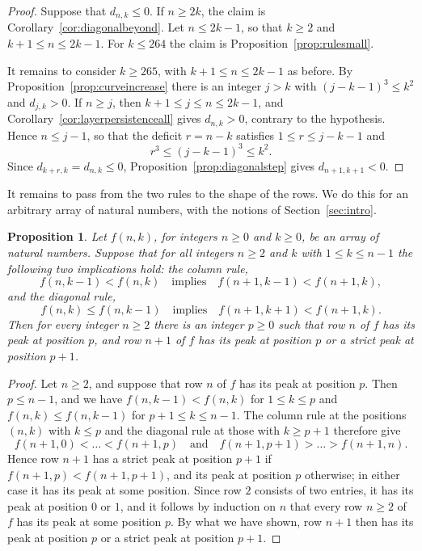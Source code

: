 \documentclass{amsart}
\makeatletter
\newtheorem{proposition}[theorem]{Proposition}
\theoremstyle{definition}
\theoremstyle{remark}
\numberwithin{equation}{section}
\def\subsection{\@startsection{subsection}{2}\z@{.5\linespacing\@plus.7\linespacing}{-.5em}{\normalfont\bfseries\boldmath}}
\makeatother
\begin{document}
\begin{proof}
Suppose that $d_{n,k}\le0$. If $n\ge2k$, the claim is
Corollary~\ref{cor:diagonalbeyond}. Let $n\le2k-1$, so that $k\ge2$ and
$k+1\le n\le2k-1$. For $k\le264$ the claim is
Proposition~\ref{prop:rulesmall}.

It remains to consider $k\ge265$, with $k+1\le n\le2k-1$ as before. By
Proposition~\ref{prop:curveincrease} there is an integer $j>k$ with
$(j-k-1)^3\le k^2$ and $d_{j,k}>0$. If $n\ge j$, then
$k+1\le j\le n\le2k-1$, and Corollary~\ref{cor:layerpersistenceall} gives
$d_{n,k}>0$, contrary to the hypothesis. Hence $n\le j-1$, so that the
deficit $r=n-k$ satisfies $1\le r\le j-k-1$ and
\[
r^3\le(j-k-1)^3\le k^2 .
\]
Since
$d_{k+r,k}=d_{n,k}\le0$, Proposition~\ref{prop:diagonalstep} gives
$d_{n+1,k+1}<0$.
\end{proof}

\subsection{The induction on the row}\label{subsec:staircase-induction}

It remains to pass from the two rules to the shape of the rows. We do this
for an arbitrary array of
natural numbers, with the notions of Section~\ref{sec:intro}.

\begin{proposition}\label{prop:rowinduction}
Let $f(n,k)$, for integers $n\ge0$ and $k\ge0$, be an array of natural
numbers. Suppose that for all integers $n\ge2$ and $k$ with $1\le k\le n-1$
the following two implications hold: the column rule,
\[
f(n,k-1)<f(n,k)\quad\text{implies}\quad f(n+1,k-1)<f(n+1,k),
\]
and the diagonal rule,
\[
f(n,k)\le f(n,k-1)\quad\text{implies}\quad f(n+1,k+1)<f(n+1,k).
\]
Then for every integer $n\ge2$ there is an integer $p\ge0$ such that row
$n$ of $f$ has its peak at position $p$, and row $n+1$ of $f$ has
its peak at position $p$ or a strict peak at position $p+1$.
\end{proposition}

\begin{proof}
Let $n\ge2$, and suppose that row $n$ of $f$ has its peak at position $p$.
Then $p\le n-1$, and we have $f(n,k-1)<f(n,k)$ for $1\le k\le p$ and
$f(n,k)\le f(n,k-1)$ for $p+1\le k\le n-1$. The column rule at the
positions $(n,k)$ with $k\le p$ and the diagonal rule at those with
$k\ge p+1$ therefore give
\[
f(n+1,0)<\dots<f(n+1,p)\quad\text{and}\quad
f(n+1,p+1)>\dots>f(n+1,n).
\]
Hence row $n+1$ has a strict peak at position $p+1$ if
$f(n+1,p)<f(n+1,p+1)$, and its peak at position $p$ otherwise; in either
case it has its peak at some position. Since row $2$ consists of two
entries, it has its peak at position $0$ or $1$, and it follows by
induction on $n$ that every row $n\ge2$ of $f$ has its peak at some
position $p$. By what we have shown, row $n+1$ then has its peak at
position $p$ or a strict peak at position $p+1$.
\end{proof}
\end{document}
